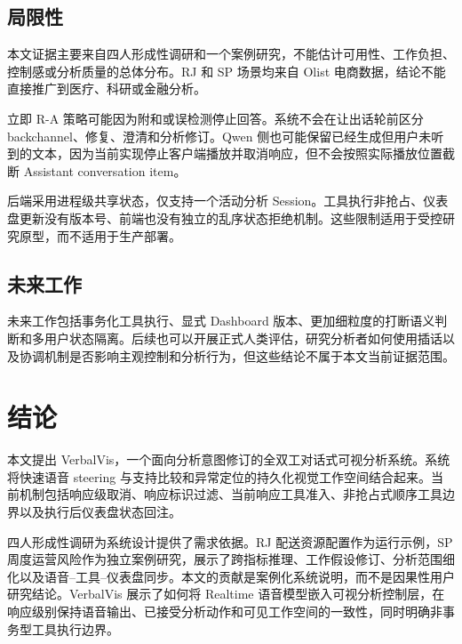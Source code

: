 \documentclass[UTF8,a4paper,10.5pt]{ctexart}
\begin{document}
\subsection{局限性}

本文证据主要来自四人形成性调研和一个案例研究，不能估计可用性、工作负担、控制感或分析质量的总体分布。RJ 和 SP 场景均来自 Olist 电商数据，结论不能直接推广到医疗、科研或金融分析。

立即 R-A 策略可能因为附和或误检测停止回答。系统不会在让出话轮前区分 backchannel、修复、澄清和分析修订。Qwen 侧也可能保留已经生成但用户未听到的文本，因为当前实现停止客户端播放并取消响应，但不会按照实际播放位置截断 Assistant conversation item。

后端采用进程级共享状态，仅支持一个活动分析 Session。工具执行非抢占、仪表盘更新没有版本号、前端也没有独立的乱序状态拒绝机制。这些限制适用于受控研究原型，而不适用于生产部署。

\subsection{未来工作}

未来工作包括事务化工具执行、显式 Dashboard 版本、更加细粒度的打断语义判断和多用户状态隔离。后续也可以开展正式人类评估，研究分析者如何使用插话以及协调机制是否影响主观控制和分析行为，但这些结论不属于本文当前证据范围。

\section{结论}

本文提出 VerbalVis，一个面向分析意图修订的全双工对话式可视分析系统。系统将快速语音 steering 与支持比较和异常定位的持久化视觉工作空间结合起来。当前机制包括响应级取消、响应标识过滤、当前响应工具准入、非抢占式顺序工具边界以及执行后仪表盘状态回注。

四人形成性调研为系统设计提供了需求依据。RJ 配送资源配置作为运行示例，SP 周度运营风险作为独立案例研究，展示了跨指标推理、工作假设修订、分析范围细化以及语音--工具--仪表盘同步。本文的贡献是案例化系统说明，而不是因果性用户研究结论。VerbalVis 展示了如何将 Realtime 语音模型嵌入可视分析控制层，在响应级别保持语音输出、已接受分析动作和可见工作空间的一致性，同时明确非事务型工具执行边界。



\end{document}

